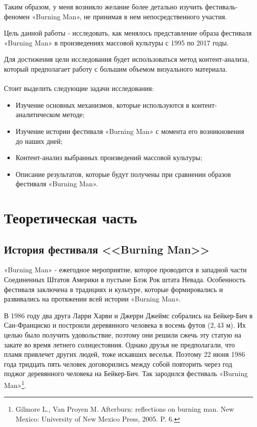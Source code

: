 \documentclass[10pt,a4paper]{report}
\begin{document}
Таким образом, у меня возникло желание более детально изучить фестиваль-
феномен «Burning Man», не принимая в нем непосредственного участия.

Цель данной работы - исследовать, как менялось представление образа фестиваля
«Burning Man» в произведениях массовой культуры с 1995 по 2017 годы.

Для достижения цели исследования будет использоваться метод контент-анализа, 
который предполагает работу с большим объемом визуального
материала.
\\
\\
Стоит выделить следующие задачи исследования:

\begin{itemize}
  \item Изучение основных механизмов, которые используются в контент-
  аналитическом методе;
  \item Изучение истории фестиваля «Burning Man» с момента его возникновения до
  наших дней;
  \item Контент-анализ выбранных произведений массовой культуры;
  \item Описание результатов, которые будут получены при сравнении образов 
  фестиваля «Burning Man».
\end{itemize}

\chapter{Теоретическая часть}
\section{История фестиваля <<Burning Man>>}

«Burning Man» - ежегодное мероприятие, которое проводится
в западной части Соединенных Штатов Америки в пустыне
Блэк Рок штата Невада. Особенность~\cite{николаева2008фестиваль} фестиваля заключена в
традициях и культуре, которые формировались и развивались
на протяжении всей истории «Burning Man».

В 1986 году два друга Ларри Харви и Джерри Джеймс
собрались на Бейкер-Бич в Сан-Франциско и построили
деревянного человека в восемь футов ($2,43$ м). Их целью
было получить удовольствие, поэтому они решили сжечь эту
статую на закате во время летнего солнцестояния. Однако
друзья не предполагали, что пламя привлечет других людей,
тоже искавших веселья. Поэтому 22 июня 1986 года тридцать
пять человек договорились между собой повторить через год
поджог деревянного человека на Бейкер-Бич. Так зародился
фестиваль «Burning Man»\footnote{Gilmore L., Van Proyen
M. Afterburn: reflections on burning man. New Mexico: 
University of New Mexico Press, 2005. P. 6.}.
\end{document}
